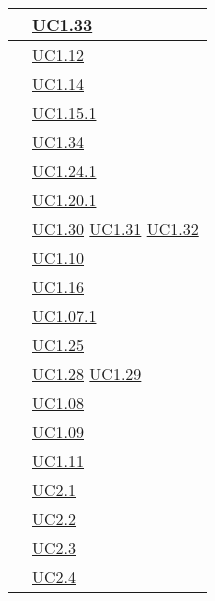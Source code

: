 \begin{longtable}{|P{6cm}|P{6cm}|}
	\hline {} & \hyperref[UC1.33]{UC1.33} \\
	\hline {} & \hyperref[UC1.12]{UC1.12} \\
	\hline {} & \hyperref[UC1.14]{UC1.14} \\
	\hline {} & \hyperref[UC1.15.1]{UC1.15.1} \\
	\hline {} & \hyperref[UC1.34]{UC1.34} \\
	\hline {} & \hyperref[UC1.24.1]{UC1.24.1} \\
	\hline {} & \hyperref[UC1.20.1]{UC1.20.1} \\	
	\hline {} & \hyperref[UC1.30]{UC1.30} \linebreak \hyperref[UC1.31]{UC1.31} \linebreak \hyperref[UC1.32]{UC1.32} \\
	\hline {} & \hyperref[UC1.10]{UC1.10} \\
	\hline {} & \hyperref[UC1.16]{UC1.16} \\
	\hline {} & \hyperref[UC1.07.1]{UC1.07.1} \\
	\hline {} & \hyperref[UC1.25]{UC1.25} \\
	\hline {} & \hyperref[UC1.28]{UC1.28} \linebreak \hyperref[UC1.29]{UC1.29}  \\	 
	\hline {} & \hyperref[UC1.08]{UC1.08} \\
	\hline {} & \hyperref[UC1.09]{UC1.09} \\
	\hline {} & \hyperref[UC1.11]{UC1.11} \\	
	\hline {} & \hyperref[UC2.1]{UC2.1} \\
	\hline {} & \hyperref[UC2.2]{UC2.2} \\
	\hline {} & \hyperref[UC2.3]{UC2.3} \\
	\hline {} & \hyperref[UC2.4]{UC2.4} \\	

\end{longtable}
